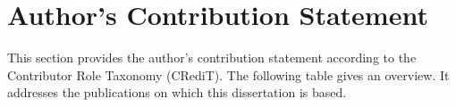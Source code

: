 \chapter*{Author's Contribution Statement}
\label{sec:acs}

This section provides the author's contribution statement according to the Contributor Role Taxonomy (CRediT).
The following table gives an overview. It addresses the publications on which this dissertation is based.
